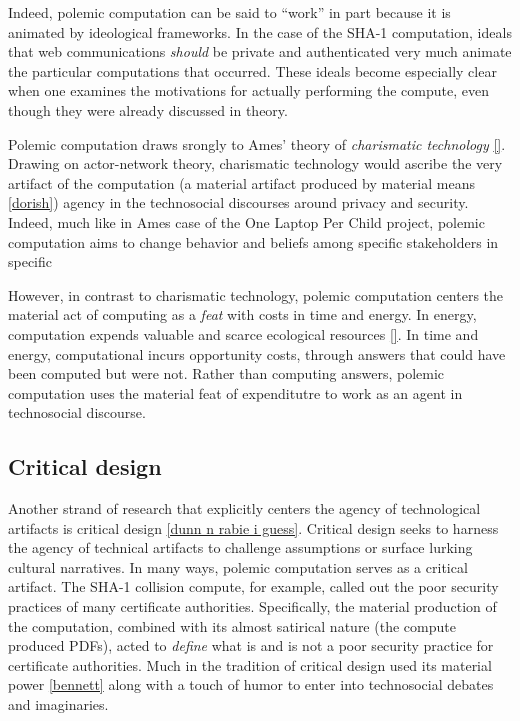 \documentclass[sigconf]{acmart}
\begin{document}
Indeed, polemic computation can be said to ``work'' in part 
because it is animated by ideological frameworks.
In the case of the SHA-1 computation,
ideals that web communications \emph{should} be private and authenticated
very much animate the particular computations that occurred.
These ideals become especially clear when one examines the motivations for actually performing the compute,
even though they were already discussed in theory.

Polemic computation draws srongly to Ames' theory of \emph{charismatic technology}
\uline{[]}.
Drawing on actor-network theory, charismatic technology would ascribe the very artifact of the computation
(a material artifact produced by material means \uline{[dorish]})
agency in the technosocial discourses around privacy and security.
Indeed, much like in Ames case of the One Laptop Per Child project,
polemic computation aims to change behavior and beliefs among specific stakeholders in specific 

However, in contrast to charismatic technology, polemic computation 
centers the material act of computing as a \emph{feat} with costs in time and energy.
In energy, computation expends valuable and scarce ecological resources \uline{[]}.
In time and energy, computational incurs opportunity costs, through answers that could have been computed but were not.
Rather than computing answers, polemic computation uses the material feat of expenditutre
to work as an agent in technosocial discourse.

\subsection{Critical design}
\label{sec:org4ba66cb}

Another strand of research that explicitly centers the agency of technological artifacts
is critical design \uline{[dunn n rabie i guess]}.
Critical design seeks to harness the agency of technical artifacts 
to challenge assumptions or surface lurking cultural narratives.
In many ways, polemic computation serves as a critical artifact.
The SHA-1 collision compute, for example, 
called out the poor security practices of many certificate authorities.
Specifically, the material production of the computation,
combined with its almost satirical nature (the compute produced PDFs),
acted to \emph{define} what is and is not a poor security practice for certificate authorities.
Much in the tradition of critical design
used its material power \uline{[bennett]} along with a touch of humor to enter into technosocial debates and imaginaries.
\end{document}
